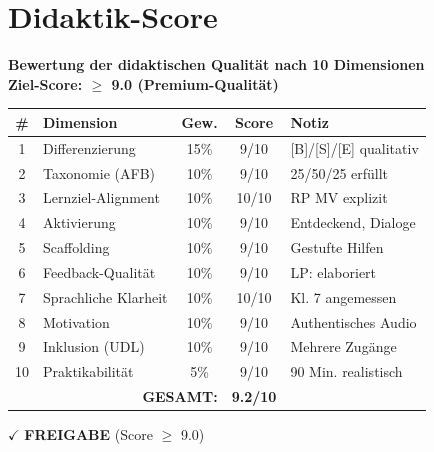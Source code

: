 \documentclass[11pt,a4paper]{article}
\begin{document}
\newpage
\section{Didaktik-Score}

\begin{scorebox}
\textbf{Bewertung der didaktischen Qualität nach 10 Dimensionen}\\
\textbf{Ziel-Score: $\geq$ 9.0 (Premium-Qualität)}

\vspace{1em}
\begin{tabular}{|c|l|c|c|p{4cm}|}
\hline
\textbf{\#} & \textbf{Dimension} & \textbf{Gew.} & \textbf{Score} & \textbf{Notiz} \\
\hline
1 & Differenzierung & 15\% & 9/10 & [B]/[S]/[E] qualitativ \\
\hline
2 & Taxonomie (AFB) & 10\% & 9/10 & 25/50/25 erfüllt \\
\hline
3 & Lernziel-Alignment & 10\% & 10/10 & RP MV explizit \\
\hline
4 & Aktivierung & 10\% & 9/10 & Entdeckend, Dialoge \\
\hline
5 & Scaffolding & 10\% & 9/10 & Gestufte Hilfen \\
\hline
6 & Feedback-Qualität & 10\% & 9/10 & LP: elaboriert \\
\hline
7 & Sprachliche Klarheit & 10\% & 10/10 & Kl. 7 angemessen \\
\hline
8 & Motivation & 10\% & 9/10 & Authentisches Audio \\
\hline
9 & Inklusion (UDL) & 10\% & 9/10 & Mehrere Zugänge \\
\hline
10 & Praktikabilität & 5\% & 9/10 & 90 Min. realistisch \\
\hline
\multicolumn{3}{|r|}{\textbf{GESAMT:}} & \textbf{9.2/10} & \\
\hline
\end{tabular}

\vspace{1em}
$\checkmark$ \textcolor{successgreen}{\textbf{FREIGABE} (Score $\geq$ 9.0)}
\end{scorebox}
\end{document}
